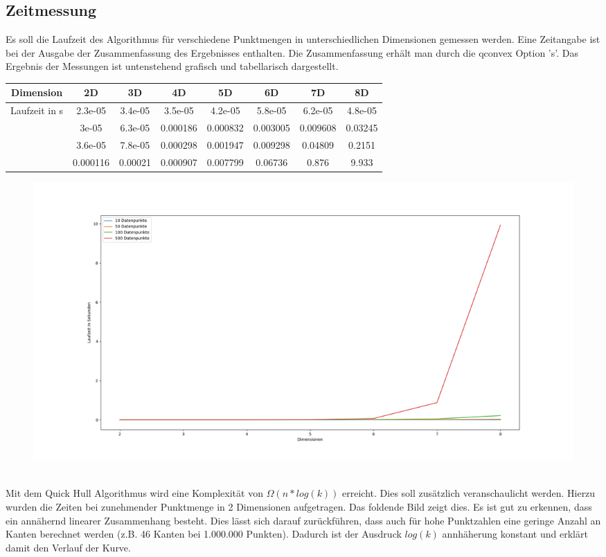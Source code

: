 \documentclass[12pt]{scrartcl}
\begin{document}
\subsection{Zeitmessung}
Es soll die Laufzeit des Algorithmus für verschiedene Punktmengen in unterschiedlichen Dimensionen gemessen werden.  Eine Zeitangabe ist bei der Ausgabe der Zusammenfassung des Ergebnisses enthalten. Die Zusammenfassung erhält man durch die qconvex Option 's'. Das Ergebnis der Messungen ist untenstehend grafisch und tabellarisch dargestellt.
\begin{center}
\begin{tabular}{||c | c c c c c c c||} 
    \hline
    Dimension & 2D &       3D &      4D &       5D &       6D &       7D &       8D      \\
    \hline \hline
    \multirow{4}{*}{Laufzeit in s} & 2.3e-05 &  3.4e-05 & 3.5e-05 &  4.2e-05 &  5.8e-05 &  6.2e-05 &  4.8e-05 \\ \cline{2-8}
                                   & 3e-05 &    6.3e-05 & 0.000186 & 0.000832 & 0.003005 & 0.009608 & 0.03245 \\ \cline{2-8}
                                   & 3.6e-05 &  7.8e-05 & 0.000298 & 0.001947 & 0.009298 & 0.04809 &  0.2151  \\ \cline{2-8}
                                   & 0.000116 & 0.00021 & 0.000907 & 0.007799 & 0.06736 &  0.876 &    9.933   \\ \hline
\end{tabular}
\end{center}

\begin{figure}[H]
    \centering
    \includegraphics[scale=0.32]{runtimes.png}
\end{figure}

\ \\ 
Mit dem Quick Hull Algorithmus wird eine Komplexität von $\Omega(n*log(k))$ erreicht. Dies soll zusätzlich veranschaulicht werden. 
Hierzu wurden die Zeiten bei zunehmender Punktmenge in 2 Dimensionen aufgetragen. Das foldende Bild zeigt dies. Es ist gut zu erkennen, dass ein annähernd linearer Zusammenhang besteht. Dies lässt sich darauf zurückführen, dass auch für hohe Punktzahlen eine geringe Anzahl an Kanten berechnet werden (z.B. 46 Kanten bei 1.000.000 Punkten). Dadurch ist der Ausdruck $log(k)$ annhäherung konstant und erklärt damit den Verlauf der Kurve.
\end{document}
